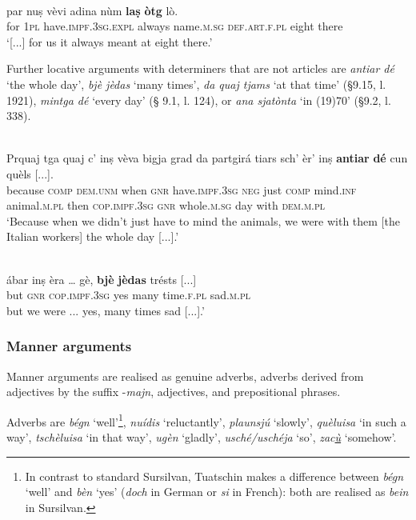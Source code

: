 \ea
\label{ex:timeofday2}
\\
\gll [...] par nuṣ vèvi adina nùm \textbf{laṣ} \textbf{òtg} lò.   \\
{} for \textsc{1pl} have.\textsc{impf.3sg.expl} always name.\textsc{m.sg} \textsc{def.art.f.pl} eight there\\
\glt `[...] for us it always meant at eight there.'
\z

Further locative arguments with determiners that are not articles are \textit{antiar dé} `the whole day', \textit{bjè jèdas} `many times', \textit{da quaj tjams} `at that time' (§9.15, l. 1921), \textit{mintga dé} `every day' (§ 9.1, l. 124), or \textit{ana sjatònta} `in (19)70' (§9.2, l. 338).

\ea
\label{ex:locwithoutdet1}
\\
\gll  Prquaj tga quaj c’ inṣ vèva bigja grad da partgirá tiars sch’ èr’ inṣ \textbf{antiar} \textbf{dé} cun quèls [...].  \\
because \textsc{comp} \textsc{dem.unm} when \textsc{gnr} have.\textsc{impf.3sg}  \textsc{neg} just \textsc{comp} mind.\textsc{inf} animal.\textsc{m.pl} then \textsc{cop.impf.3sg} \textsc{gnr} whole.\textsc{m.sg} day with \textsc{dem.m.pl}\\
\glt `Because when we didn’t just have to mind the animals, we were with them [the Italian workers] the whole day [...].'
\z

\ea
\label{}
\\
\gll [...] ábar inṣ èra … gè,  \textbf{bjè} \textbf{jèdas} trésts [...]\\
{} but \textsc{gnr} \textsc{cop.impf.3sg} {} yes many time.\textsc{f.pl} sad.\textsc{m.pl}\\
\glt [...] but we were ... yes, many times sad [...].'
\z


\subsubsection{Manner arguments}
Manner arguments are realised as genuine adverbs, adverbs derived from adjectives by the suffix -\textit{majn}, adjectives, and prepositional phrases.

Adverbs are \textit{bégn} `well'\footnote{In contrast to standard Sursilvan, Tuatschin makes a difference between \textit{bégn} `well' and \textit{bèn} `yes' (\textit{doch} in German or \textit{si} in French): both are realised as \textit{bein} in Sursilvan.}, \textit{nuídis} `reluctantly', \textit{plaunsjú} `slowly', \textit{quèluisa} `in such a way', \textit{tschèluisa} `in that way', \textit{ugèn} `gladly', \textit{usché/uschéja} `so', \textit{zac\underline{ù}} `somehow'.

